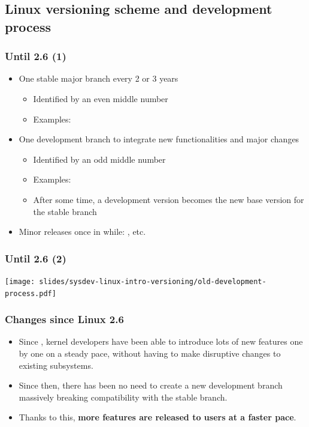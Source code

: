 \subsection{Linux versioning scheme and development process}

\begin{frame}
  \frametitle{Until 2.6 (1)}
  \begin{itemize}
  \item One stable major branch every 2 or 3 years
    \begin{itemize}
    \item Identified by an even middle number
    \item Examples: 
    \end{itemize}
  \item One development branch to integrate new functionalities and
    major changes
    \begin{itemize}
    \item Identified by an odd middle number
    \item Examples: 
    \item After some time, a development version becomes the new base
      version for the stable branch
    \end{itemize}
  \item Minor releases once in while: , etc.
  \end{itemize}
\end{frame}

\begin{frame}
  \frametitle{Until 2.6 (2)}
  \begin{center}
    \texttt{[image: slides/sysdev-linux-intro-versioning/old-development-process.pdf]}
  \end{center} \end{frame}

\begin{frame}
  \frametitle{Changes since Linux 2.6}
  \begin{itemize}
  \item Since , kernel developers have been able to
    introduce lots of new features one by one on a steady pace,
    without having to make disruptive changes to existing subsystems.
  \item Since then, there has been no need to create a new development branch
    massively breaking compatibility with the stable branch.
  \item Thanks to this, {\bf more features are released to users at a
      faster pace}.
  \end{itemize}
\end{frame}

